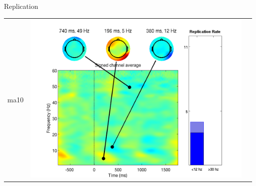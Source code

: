 \documentclass[final]{beamer}
\begin{document}
\begin{frame}{}
\begin{textblock}{67}
\begin{block}{Replication}
\begin{tabular}{c c c}
ma10} & \includegraphics{gamma11} &
\end{tabular}
\end{block}
\end{textblock}
\end{frame}
\end{document}
